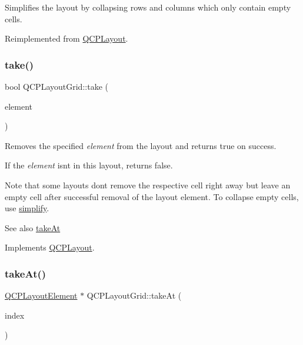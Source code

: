 Simplifies the layout by collapsing rows and columns which only contain empty cells. 

Reimplemented from \hyperlink{classQCPLayout_a41e6ac049143866e8f8b4964efab01b2}{Q\+C\+P\+Layout}.

\mbox{\label{classQCPLayoutGrid_aee961c2eb6cf8a85dcbc5a7d7b6c1a00}} 
\subsubsection{\texorpdfstring{take()}{take()}}
{\footnotesize\ttfamily bool Q\+C\+P\+Layout\+Grid\+::take (\begin{DoxyParamCaption}\item[{\hyperlink{classQCPLayoutElement}{Q\+C\+P\+Layout\+Element} $\ast$}]{element }\end{DoxyParamCaption})\hspace{0.3cm}{\ttfamily [virtual]}}

Removes the specified {\itshape element} from the layout and returns true on success.

If the {\itshape element} isn\textquotesingle{}t in this layout, returns false.

Note that some layouts don\textquotesingle{}t remove the respective cell right away but leave an empty cell after successful removal of the layout element. To collapse empty cells, use \hyperlink{classQCPLayoutGrid_a38621ca7aa633b6a9a88617df7f08672}{simplify}.

\begin{DoxySeeAlso}{See also}
\hyperlink{classQCPLayoutGrid_a17dd220234d1bbf8835abcc666384d45}{take\+At} 
\end{DoxySeeAlso}


Implements \hyperlink{classQCPLayout_ada26cd17e56472b0b4d7fbbc96873e4c}{Q\+C\+P\+Layout}.

\mbox{\label{classQCPLayoutGrid_a17dd220234d1bbf8835abcc666384d45}} 
\subsubsection{\texorpdfstring{take\+At()}{takeAt()}}
{\footnotesize\ttfamily \hyperlink{classQCPLayoutElement}{Q\+C\+P\+Layout\+Element} $\ast$ Q\+C\+P\+Layout\+Grid\+::take\+At (\begin{DoxyParamCaption}\item[{int}]{index }\end{DoxyParamCaption})\hspace{0.3cm}{\ttfamily [virtual]}}

